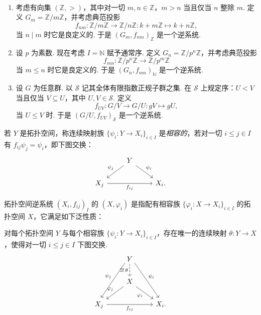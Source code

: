\begin{examples}\label{c3-ex-1-4}
\
\begin{enumerate}[label=(\arabic*),leftmargin=*]
    \item 考虑有向集 $(\mathbb{Z},>)$，其中对一切 $m,n\in\mathbb{Z}$，$m>n$ 当且仅当 $n$ 整除 $m$. 定义 $G_m=\mathbb{Z}/m\mathbb{Z}$，并考虑典范投影
    \[
    f_{nm}:\mathbb{Z}/m\mathbb{Z}\to\mathbb{Z}/n\mathbb{Z}:k+m\mathbb{Z}\mapsto k+n\mathbb{Z},
    \]
    当 $n\mid m$ 时它是良定义的. 于是 $(G_m,f_{nm})_{\mathbb{Z}}$ 是一个逆系统.
    \item 设 $p$ 为素数. 现在考虑 $I=\mathbb{N}$ 赋予通常序. 定义 $G_n=\mathbb{Z}/p^n\mathbb{Z}$，并考虑典范投影
    \[
    f_{mn}:\mathbb{Z}/p^n\mathbb{Z}\to\mathbb{Z}/p^m\mathbb{Z}
    \]
    当 $m\leq n$ 时它是良定义的. 于是 $(G_n,f_{mn})_{\mathbb{N}}$ 是一个逆系统.
    \item 设 $G$ 为任意群. 以 $\mathcal{S}$ 记其全体有限指数正规子群之集. 在 $\mathcal{S}$ 上规定序：$U<V$ 当且仅当 $V\subseteq U$，其中 $U,V\in\mathcal{S}$. 定义
    \[
    f_{UV}:G/V\to G/U:gV\mapsto gU,
    \]
    当 $U\leq V$ 时. 于是 $(G/U,f_{UV})_{\mathcal{S}}$ 是一个逆系统.
\end{enumerate}
\end{examples}

\begin{definition}\label{c3-def-1-5}
若 $Y$ 是拓扑空间，称连续映射族 $\{\psi_i:Y\to X_i\}_{i\in I}$ 是\emph{相容的}，若对一切 $i\leq j\in I$ 有 $f_{ij}\psi_j=\psi_i$，即下图交换：
\[
\begin{tikzcd}
& Y \arrow[dl, "\psi_j"'] \arrow[dr, "\psi_i"] & \\
X_j \arrow[rr, "f_{ij}"'] & & X_i.
\end{tikzcd}
\]
\end{definition}

\begin{definition}\label{c3-def-1-6}
拓扑空间逆系统 $(X_i,f_{ij})_I$ 的  $(X,\varphi_i)$ 是指配有相容族 $\{\varphi_i:X\to X_i\}_{i\in I}$ 的拓扑空间 $X$，它满足如下泛性质：

对每个拓扑空间 $Y$ 与每个相容族 $\{\psi_i:Y\to X_i\}_{i\in I}$，存在唯一的连续映射 $\theta:Y\to X$，使得对一切 $i\leq j\in I$ 下图交换.
\[
\begin{tikzcd}
& Y \arrow[d, dashed, "\exists!\,\theta"'] \arrow[ddl, shift right=3pt, "\psi_j"'] \arrow[ddr, shift left=3pt, "\psi_i"] & \\
& X \arrow[dl, "\varphi_j"'] \arrow[dr, "\varphi_i"'] & \\
X_j \arrow[rr, "f_{ij}"'] & & X_i.
\end{tikzcd}
\]
\end{definition}


